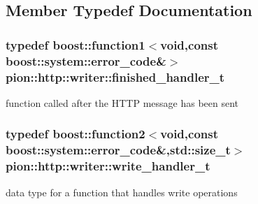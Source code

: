 \subsection{Member Typedef Documentation}
\hypertarget{classpion_1_1http_1_1writer_a7e3ce4b88e0427adf673a99fca3af982}{
\subsubsection[{finished\-\_\-handler\-\_\-t}]{\setlength{\rightskip}{0pt plus 5cm}typedef boost\-::function1$<$void,const boost\-::system\-::error\-\_\-code\&$>$ {\bf pion\-::http\-::writer\-::finished\-\_\-handler\-\_\-t}\hspace{0.3cm}{\ttfamily [protected]}}}\label{classpion_1_1http_1_1writer_a7e3ce4b88e0427adf673a99fca3af982}


function called after the H\-T\-T\-P message has been sent 

\hypertarget{classpion_1_1http_1_1writer_a36fa31c850362d907559a0c1157a1bf3}{
\subsubsection[{write\-\_\-handler\-\_\-t}]{\setlength{\rightskip}{0pt plus 5cm}typedef boost\-::function2$<$void,const boost\-::system\-::error\-\_\-code\&,std\-::size\-\_\-t$>$ {\bf pion\-::http\-::writer\-::write\-\_\-handler\-\_\-t}\hspace{0.3cm}{\ttfamily [protected]}}}\label{classpion_1_1http_1_1writer_a36fa31c850362d907559a0c1157a1bf3}


data type for a function that handles write operations 




